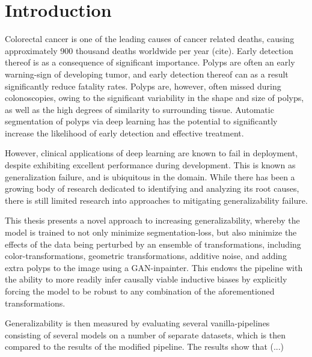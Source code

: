     \chapter{Introduction}
    \setcounter{chapter}{1}
    Colorectal cancer is one of the leading causes of cancer related deaths, causing approximately 900 thousand deaths worldwide per year (cite). Early detection thereof is as a consequence of significant importance. Polyps are often an early warning-sign of developing tumor, and early detection thereof can as a result significantly reduce fatality rates. Polyps are, however, often missed during colonoscopies, owing to the significant variability in the shape and size of polyps, as well as the high degrees of similarity to surrounding tissue. Automatic segmentation of polyps via deep learning has the potential to significantly increase the likelihood of early detection and effective treatment. 
    
    However, clinical applications of deep learning are known to fail in deployment, despite exhibiting excellent performance during development. This is known as generalization failure, and is ubiquitous in the domain. While there has been a growing body of research dedicated to identifying and analyzing its root causes, there is still limited research into approaches to mitigating generalizability failure. 
    
    This thesis presents a novel approach to increasing generalizability, whereby the model is trained to not only minimize segmentation-loss, but also minimize the effects of the data being perturbed by an ensemble of transformations, including color-transformations, geometric transformations, additive noise, and adding extra polyps to the image using a GAN-inpainter. This endows the pipeline with the ability to more readily infer causally viable inductive biases by explicitly forcing the model to be robust to any combination of the aforementioned transformations. 
    
    Generalizability is then measured by evaluating several vanilla-pipelines consisting of several models on a number of separate datasets, which is then compared to the results of the modified pipeline. The results show that (...)
    
   

